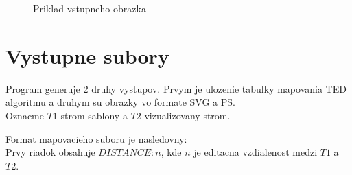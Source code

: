 \begin{figure}[H]
  \caption{Priklad vstupneho obrazka}
  \label{obr:mouse_ps}
\end{figure}

\section{Vystupne subory}

Program generuje 2 druhy vystupov. Prvym je ulozenie tabulky mapovania TED algoritmu a druhym su obrazky
vo formate SVG a PS. \\

Oznacme $T1$ strom sablony a $T2$ vizualizovany strom.

Format mapovacieho suboru je nasledovny: \\
Prvy riadok obsahuje $DISTANCE: n$, kde $n$ je
editacna vzdialenost medzi $T1$ a $T2$.

